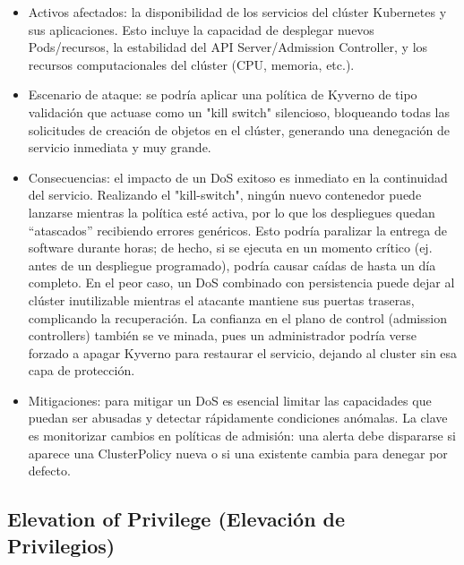 \documentclass[12pt,twoside,titlepage]{report}
\begin{document}
\begin{itemize}
    \item Activos afectados: la disponibilidad de los servicios del clúster Kubernetes y sus aplicaciones. Esto incluye la capacidad de desplegar nuevos Pods/recursos, la estabilidad del API Server/Admission Controller, y los recursos computacionales del clúster (CPU, memoria, etc.).
    \item Escenario de ataque: se podría aplicar una política de Kyverno de tipo validación que actuase como un "kill switch" silencioso, bloqueando todas las solicitudes de creación de objetos en el clúster, generando una denegación de servicio inmediata y muy grande.
    \item Consecuencias: el impacto de un DoS exitoso es inmediato en la continuidad del servicio. Realizando el "kill-switch", ningún nuevo contenedor puede lanzarse mientras la política esté activa, por lo que los despliegues quedan “atascados” recibiendo errores genéricos. Esto podría paralizar la entrega de software durante horas; de hecho, si se ejecuta en un momento crítico (ej. antes de un despliegue programado), podría causar caídas de hasta un día completo. En el peor caso, un DoS combinado con persistencia puede dejar al clúster inutilizable mientras el atacante mantiene sus puertas traseras, complicando la recuperación. La confianza en el plano de control (admission controllers) también se ve minada, pues un administrador podría verse forzado a apagar Kyverno para restaurar el servicio, dejando al cluster sin esa capa de protección.
    \item Mitigaciones: para mitigar un DoS es esencial limitar las capacidades que puedan ser abusadas y detectar rápidamente condiciones anómalas. La clave es monitorizar cambios en políticas de admisión: una alerta debe dispararse si aparece una ClusterPolicy nueva o si una existente cambia para denegar por defecto.
\end{itemize}

\subsection{Elevation of Privilege (Elevación de Privilegios)}
\end{document}
